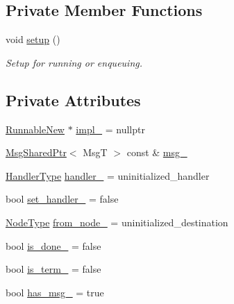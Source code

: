 \subsection*{Private Member Functions}
\begin{DoxyCompactItemize}
\item 
void \hyperlink{structvt_1_1runnable_1_1_runnable_maker_add114dad8a3f0769bed8b8396ba9a13a}{setup} ()
\begin{DoxyCompactList}\small\item\em Setup for running or enqueuing. \end{DoxyCompactList}\end{DoxyCompactItemize}
\subsection*{Private Attributes}
\begin{DoxyCompactItemize}
\item 
\hyperlink{structvt_1_1runnable_1_1_runnable_new}{Runnable\+New} $\ast$ \hyperlink{structvt_1_1runnable_1_1_runnable_maker_abae85bf10b5b296af40656123ec5a111}{impl\+\_\+} = nullptr
\item 
\hyperlink{namespacevt_ab2b3d506ec8e8d1540aede826d84a239}{Msg\+Shared\+Ptr}$<$ MsgT $>$ const  \& \hyperlink{structvt_1_1runnable_1_1_runnable_maker_a95ea956b75e1ea1ca8084462cc35f4bf}{msg\+\_\+}
\item 
\hyperlink{namespacevt_af64846b57dfcaf104da3ef6967917573}{Handler\+Type} \hyperlink{structvt_1_1runnable_1_1_runnable_maker_a627ad83f0608f9b91c5ecedecf2f8d75}{handler\+\_\+} = uninitialized\+\_\+handler
\item 
bool \hyperlink{structvt_1_1runnable_1_1_runnable_maker_a52fd27acc3c3259743fdd7aed09d690d}{set\+\_\+handler\+\_\+} = false
\item 
\hyperlink{namespacevt_a866da9d0efc19c0a1ce79e9e492f47e2}{Node\+Type} \hyperlink{structvt_1_1runnable_1_1_runnable_maker_ad053690f0793a709289f3c1d240a2851}{from\+\_\+node\+\_\+} = uninitialized\+\_\+destination
\item 
bool \hyperlink{structvt_1_1runnable_1_1_runnable_maker_a1a09d169753ee4c91ba1b42c291038f0}{is\+\_\+done\+\_\+} = false
\item 
bool \hyperlink{structvt_1_1runnable_1_1_runnable_maker_a1f1afd6fa4a701c8e620e30838099725}{is\+\_\+term\+\_\+} = false
\item 
bool \hyperlink{structvt_1_1runnable_1_1_runnable_maker_a0cd87f711041bf7cfa22ef5746ee880c}{has\+\_\+msg\+\_\+} = true
\end{DoxyCompactItemize}


